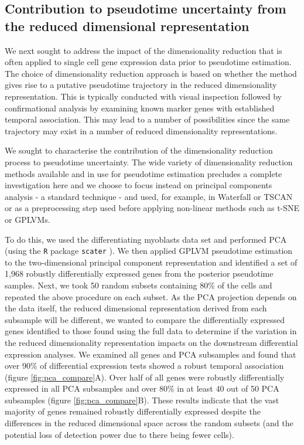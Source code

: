 \subsection{Contribution to pseudotime uncertainty from the reduced dimensional representation}

We next sought to address the impact of the dimensionality reduction that is often applied to single cell gene expression data prior to pseudotime estimation. The choice of dimensionality reduction approach is based on whether the method gives rise to a putative pseudotime trajectory in the reduced dimensionality representation. This is typically conducted with visual inspection followed by confirmational analysis by examining known marker genes with established temporal association. This may lead to a number of possibilities since the same trajectory may exist in a number of reduced dimensionality representations.

We sought to characterise the contribution of the dimensionality reduction process to pseudotime uncertainty. The wide variety of dimensionality reduction methods available and in use for pseudotime estimation precludes a complete investigation here and we choose to focus instead on principal components analysis - a standard technique - and used, for example, in Waterfall \cite{Shin2015} or TSCAN \cite{Ji2016-gx} or as a preprocessing step used before applying non-linear methods such as t-SNE or GPLVMs.

To do this, we used the differentiating myoblasts data set \cite{Trapnell2014-xi} and performed PCA (using the \texttt{R} package \texttt{scater} \cite{McCarthy2017-we}). We then applied GPLVM pseudotime estimation to the two-dimensional principal component representation and identified a set of 1,968 robustly differentially expressed genes from the posterior pseudotime samples. Next, we took 50 random subsets containing 80\% of the cells and repeated the above procedure on each subset. As the PCA projection depends on the data itself, the reduced dimensional representation derived from each subsample will be different, we wanted to compare the differentially expressed genes identified to those found using the full data to determine if the variation in the reduced dimensionality representation impacts on the downstream differential expression analyses. We examined all genes and PCA subsamples and found that over 90\% of differential expression tests showed a robust temporal association (figure \ref{fig:pca_compare}A). Over half of all genes were robustly differentially expressed in all PCA subsamples and over 80\% in at least 40 out of 50 PCA subsamples (figure \ref{fig:pca_compare}B). These results indicate that the vast majority of genes remained robustly differentially expressed despite the differences in the reduced dimensional space across the random subsets (and the potential loss of detection power due to there being fewer cells).

